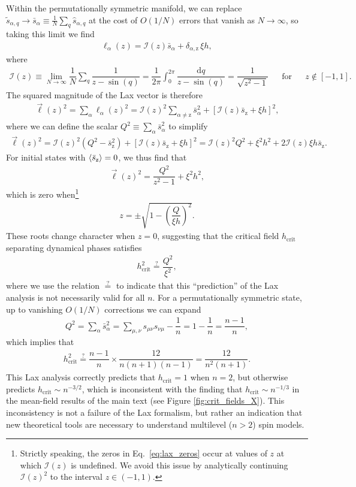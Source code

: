 \documentclass[aps,pra,nofootinbib,twocolumn,superscriptaddress]{revtex4-2}
\renewcommand{\t}{\text} %
\newcommand{\f}[2]{\dfrac{#1}{#2}} %
\newcommand{\p}[1]{\left(#1\right)} %
\renewcommand{\sp}[1]{\left[#1\right]} %
\newcommand{\bk}{\braket} %
\renewcommand{\dd}{\text{d}} %
\newcommand{\1}{\mathds{1}}
\newcommand{\s}{\hat{s}}
\newcommand{\z}{\text{z}}
\newcommand{\I}{\mathcal{I}}
\newcommand{\crit}{\text{crit}}
\begin{document}
Within the permutationally symmetric manifold, we can replace $\tilde{s}_{\alpha,q}\to\bar{s}_\alpha\equiv\frac1N\sum_q \s_{\alpha,q}$ at the cost of $O(1/N)$ errors that vanish as $N\to\infty$, so taking this limit we find
\begin{align}
  \ell_\alpha\p{z}
  = \I\p{z} \bar{s}_\alpha
  + \delta_{\alpha,\z} \, \xi h,
\end{align}
where
\begin{align}
  \I\p{z} \equiv \lim_{N\to\infty} \f1N \sum_q \f1{z-\sin\p{q}}
  = \f1{2\pi} \int_0^{2\pi} \f{\dd q}{z-\sin\p{q}}
  = \f1{\sqrt{z^2-1}}
  &&
  \t{for}
  &&
  z \notin \sp{-1,1}.
\end{align}
The squared magnitude of the Lax vector is therefore
\begin{align}
  \vec\ell\p{z}^2
  = \sum_\alpha \ell_\alpha\p{z}^2
  = \I\p{z}^2 \sum_{\alpha\ne\z} \bar{s}_\alpha^2
  + \sp{\I\p{z} \bar{s}_\z + \xi h}^2,
\end{align}
where we can define the scalar $Q^2\equiv\sum_\alpha \bar{s}_\alpha^2$ to simplify
\begin{align}
  \vec\ell\p{z}^2
  = \I\p{z}^2 \p{Q^2 - \bar{s}_\z^2}
  + \sp{\I\p{z} \bar{s}_\z + \xi h}^2
  = \I\p{z}^2 Q^2 + \xi^2 h^2
  + 2 \I\p{z} \xi h \bar{s}_\z.
\end{align}
For initial states with $\bk{\bar{s}_\z}=0$, we thus find that
\begin{align}
  \vec\ell\p{z}^2 = \f{Q^2}{z^2-1} + \xi^2 h^2,
\end{align}
which is zero when\footnote{
Strictly speaking, the zeros in Eq.~\eqref{eq:lax_zeros} occur at values of $z$ at which $\I\p{z}$ is undefined.
We avoid this issue by analytically continuing $\I\p{z}^2$ to the interval $z\in(-1,1)$.
}
\begin{align}
  z = \pm \sqrt{1 - \p{\f{Q}{\xi h}}^2}.
  \label{eq:lax_zeros}
\end{align}
These roots change character when $z=0$, suggesting that the critical field $h_\crit$ separating dynamical phases satisfies
\begin{align}
  h_\crit^2 \stackrel{?}{=} \f{Q^2}{\xi^2},
\end{align}
where we use the relation $\stackrel{?}{=}$ to indicate that this ``prediction'' of the Lax analysis is not necessarily valid for all $n$.
For a permutationally symmetric state, up to vanishing $O(1/N)$ corrections we can expand
\begin{align}
  Q^2 = \sum_\alpha \bar{s}_\alpha^2
  = \sum_{\mu,\nu} s_{\mu\nu} s_{\nu\mu} - \f1n
  = 1 - \f1n
  = \f{n-1}{n},
\end{align}
which implies that
\begin{align}
  h_\crit^2 \stackrel{?}{=} \f{n-1}{n} \times \f{12}{n(n+1)(n-1)}
  = \f{12}{n^2\p{n+1}}.
\end{align}
This Lax analysis correctly predicts that $h_\crit=1$ when $n=2$, but otherwise predicts $h_\crit\sim n^{-3/2}$, which is inconsistent with the finding that $h_\crit\sim n^{-1/3}$ in the mean-field results of the main text (see Figure \ref{fig:crit_fields_X}).
This inconsistency is not a failure of the Lax formalism, but rather an indication that new theoretical tools are necessary to understand multilevel ($n>2$) spin models.
\end{document}
